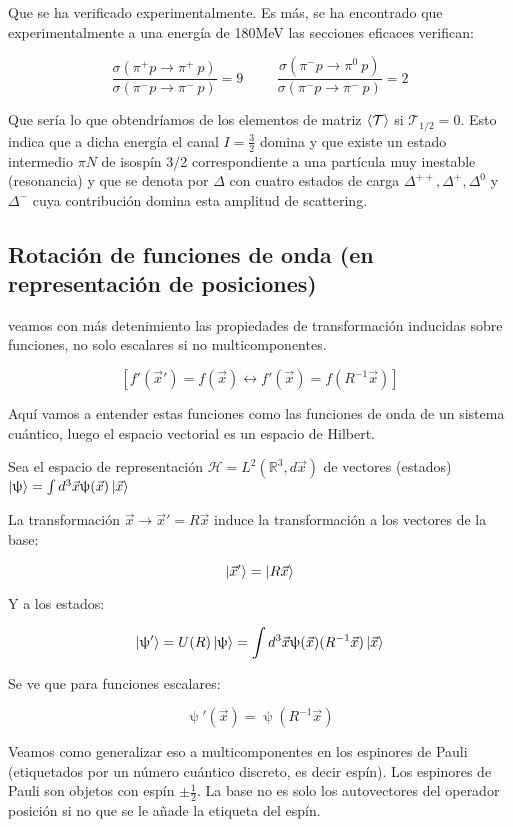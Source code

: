 Que se ha verificado experimentalmente. Es más, se ha encontrado que experimentalmente a una energía de 180MeV las secciones eficaces verifican:

$$\frac{\sigma (\pi ^+ p \to \pi ^+ \ p)}{\sigma (\pi ^-p \to \pi ^- \ p)}=9 \hspace{1cm} \frac{\sigma (\pi ^-p \to \pi ^0 \ p)}{\sigma (\pi ^-p \to \pi ^- \ p)}=2$$

Que sería lo que obtendríamos de los elementos de matriz $\braket{\mathcal{T}}$ si $\mathcal{T}_{1/2}=0$. Esto indica que a dicha energía el canal $I=\frac{3}{2}$ domina y que existe un estado intermedio $\pi N$ de isospín 3/2 correspondiente a una partícula muy inestable (resonancia) y que se denota por $\Delta$ con cuatro estados de carga $\Delta ^{++}, \Delta ^{+}, \Delta ^{0}$ y $\Delta ^{-}$ cuya contribución domina esta amplitud de scattering.

\subsection{Rotación de funciones de onda (en representación de posiciones)}

veamos con más detenimiento las propiedades de transformación inducidas sobre funciones, no solo escalares si no multicomponentes.

$$[f'(\Vec{x}')=f(\Vec{x}) \leftrightarrow f'(\Vec{x})=f(R^{-1}\Vec{x})]$$

Aquí vamos a entender estas funciones como las funciones de onda de un sistema cuántico, luego el espacio vectorial es un espacio de Hilbert.

\smallskip
Sea el espacio de representación $\mathcal{H}=L^2(\mathds{R}^3,d\Vec{x})$ de vectores (estados) $\ket{\uppsi}=\int d^3\Vec{x} \uppsi (\Vec{x})\ket{\Vec{x}}$

La transformación $\Vec{x} \to \Vec{x}'=R\Vec{x}$ induce la transformación a los vectores de la base:

$$\ket{\Vec{x}'}=\ket{R\Vec{x}}$$

Y a los estados:

$$\ket{\uppsi '}=U(R)\ket{\uppsi}=\int d^3\Vec{x} \uppsi (\Vec{x})(R^{-1}\Vec{x})\ket{\Vec{x}}$$

Se ve que para funciones escalares:

$$\uppsi '(\Vec{x})=\uppsi (R^{-1}\Vec{x})$$


Veamos como generalizar eso a multicomponentes en los espinores de Pauli (etiquetados por un número cuántico discreto, es decir espín). Los espinores de Pauli son objetos con espín $\pm \frac{1}{2}$. La base no es solo los autovectores del operador posición si no que se le añade la etiqueta del espín.


